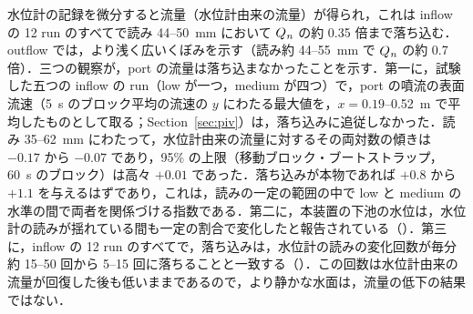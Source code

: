 \begin{ja}
水位計の記録を微分すると流量（水位計由来の流量）が得られ，これは inflow の 12 run のすべてで読み 44--50~mm において $Q_{\mathit{n}}$ の約 0.35 倍まで落ち込む．outflow では，より浅く広いくぼみを示す（読み約 44--55~mm で $Q_{\mathit{n}}$ の約 0.7 倍）．三つの観察が，port の流量は落ち込まなかったことを示す．第一に，試験した五つの inflow の run（low が一つ，medium が四つ）で，port の噴流の表面流速（5~s のブロック平均の流速の $y$ にわたる最大値を，$x = 0.19$--0.52~m で平均したものとして取る；Section~\ref{sec:piv}）は，落ち込みに追従しなかった．読み 35--62~mm にわたって，水位計由来の流量に対するその両対数の傾きは $-0.17$ から $-0.07$ であり，95\% の上限（移動ブロック・ブートストラップ，60~s のブロック）は高々 $+0.01$ であった．落ち込みが本物であれば $+0.8$ から $+1.1$ を与えるはずであり，これは，読みの一定の範囲の中で low と medium の水準の間で両者を関係づける指数である．第二に，本装置の下池の水位は，水位計の読みが揺れている間も一定の割合で変化したと報告されている（）．第三に，inflow の 12 run のすべてで，落ち込みは，水位計の読みの変化回数が毎分約 15--50 回から 5--15 回に落ちることと一致する（）．この回数は水位計由来の流量が回復した後も低いままであるので，より静かな水面は，流量の低下の結果ではない．
\end{ja}

